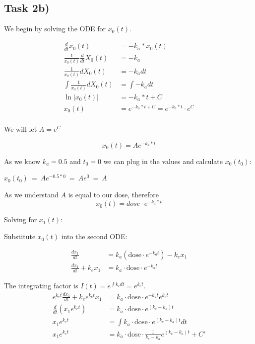 \documentclass[]{scrartcl}
\begin{document}

\subsection*{Task 2b)}


We begin by solving the ODE for $x_0(t)$.

\begin{align*}
	\frac{d}{dt} x_0(t) &= - k_a * x_0(t) \\
	\frac{1}{x_0(t)} \frac{d}{dt} X_0(t) &= - k_a \\
	\frac{1}{x_0(t)} d X_0(t) &= - k_a dt \\
	\int \frac{1}{x_0(t)} d X_0(t) &= \int - k_a dt \\
	\ln \vert x_0(t) \vert &= - k_a * t + C \\
	x_0(t) &= e^{- k_a * t + C} = e^{- k_a * t} \cdot e^C \\
\end{align*}

We will let $A = e^C$

$$
	x_0(t) = Ae^{- k_a * t}
$$

As we know $k_a = 0.5$ and $t_0 = 0$ we can plug in the values and calculate $x_0(t_0)$:

\begin{center}
	$x_0(t_0) ~ = ~ Ae^{- 0.5 * 0} ~ = ~ Ae^0 ~ = ~ A$
\end{center}

As we understand $A$ is equal to our dose, therefore
$$
	x_0(t) = dose \cdot e^{- k_a * t}
$$

Solving for $x_1(t)$:

Substitute $x_0(t)$ into the second ODE:

\begin{align*}
    \frac{dx_1}{dt} &= k_a (\text{dose} \cdot e^{-k_a t}) - k_e x_1\\
    \frac{dx_1}{dt} + k_e x_1 &= k_a \cdot \text{dose} \cdot e^{-k_a t}
\end{align*}

The integrating factor is $I(t) = e^{\int k_e dt} = e^{k_e t}$.
\begin{align*}
e^{k_e t} \frac{dx_1}{dt} + k_e e^{k_e t} x_1 &= k_a \cdot \text{dose} \cdot e^{-k_a t} e^{k_e t}\\
\frac{d}{dt}(x_1 e^{k_e t}) &= k_a \cdot \text{dose} \cdot e^{(k_e - k_a)t}\\
x_1 e^{k_e t} &= \int k_a \cdot \text{dose} \cdot e^{(k_e - k_a)t} dt \\
x_1 e^{k_e t} &= k_a \cdot \text{dose} \cdot \frac{1}{k_e - k_a} e^{(k_e - k_a)t} + C'
\end{align*}
\end{document}

